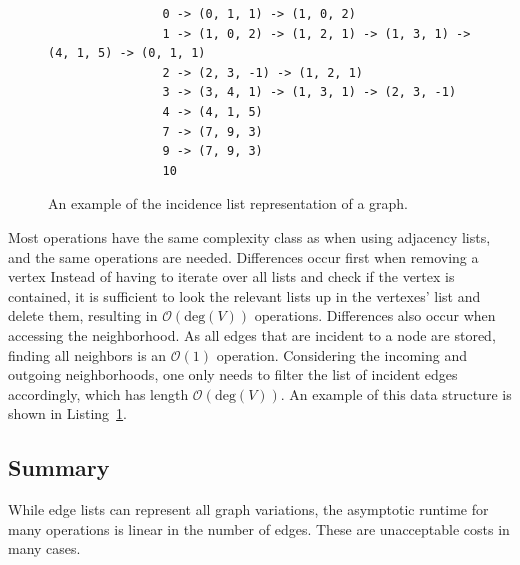             \begin{figure}[htp]
            \begin{center}
            \begin{verbatim}
                0 -> (0, 1, 1) -> (1, 0, 2)
                1 -> (1, 0, 2) -> (1, 2, 1) -> (1, 3, 1) -> (4, 1, 5) -> (0, 1, 1)
                2 -> (2, 3, -1) -> (1, 2, 1)
                3 -> (3, 4, 1) -> (1, 3, 1) -> (2, 3, -1)
                4 -> (4, 1, 5)
                7 -> (7, 9, 3)
                9 -> (7, 9, 3)
                10
            \end{verbatim}
            \end{center}
            \caption{An example of the incidence list representation of a graph.}
            \label{incidencel}
            \end{figure}
            
            Most operations have the same complexity class as when using adjacency lists, and the same operations are needed. 
            Differences occur first when removing a vertex
            Instead of having to iterate over all lists and check if the vertex is contained, it is sufficient to look the relevant lists up in the vertexes' list and delete them, resulting in $\mathcal{O}(\text{deg}(V))$ operations.        
            Differences also occur when accessing the neighborhood. 
            As all edges that are incident to a node are stored, finding all neighbors is an $\mathcal{O}(1)$ operation. 
            Considering the incoming and outgoing neighborhoods, one only needs to filter the list of incident edges accordingly, which has length $\mathcal{O}(\text{deg}(V))$.
            An example of this data structure is shown in Listing~\ref{incidencel}.
        
        \subsection{Summary}
            While edge lists can represent all graph variations, the asymptotic runtime for many operations is linear in the number of edges. 
            These are unacceptable costs in many cases.
            
